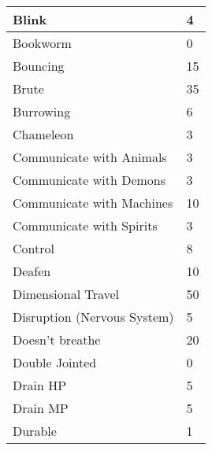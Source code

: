 \documentclass[twoside]{book}
\begin{document}
\begin{longtable}{p{1.25in}l}
  \raggedright
           Blink 
  &
   4 
  \tabularnewline
  \hline
      
  \raggedright
           Bookworm 
  &
   0 
  \tabularnewline
  \hline
      
  \raggedright
           Bouncing 
  &
   15 
  \tabularnewline
  \hline
      
  \raggedright
           Brute 
  &
   35 
  \tabularnewline
  \hline
      
  \raggedright
           Burrowing 
  &
   6 
  \tabularnewline
  \hline
      
  \raggedright
           Chameleon 
  &
   3 
  \tabularnewline
  \hline
      
  \raggedright
           Communicate with Animals
           
  &
   3 
  \tabularnewline
  \hline
      
  \raggedright
           Communicate with Demons
           
  &
   3 
  \tabularnewline
  \hline
      
  \raggedright
           Communicate with Machines
           
  &
   10 
  \tabularnewline
  \hline
      
  \raggedright
           Communicate with Spirits
           
  &
   3 
  \tabularnewline
  \hline
      
  \raggedright
           Control 
  &
   8 
  \tabularnewline
  \hline
      
  \raggedright
           Deafen 
  &
   10 
  \tabularnewline
  \hline
      
  \raggedright
           Dimensional Travel 
  &
   50 
  \tabularnewline
  \hline
      
  \raggedright
           Disruption (Nervous System)
           
  &
   5 
  \tabularnewline
  \hline
      
  \raggedright
           Doesn't breathe 
  &
   20 
  \tabularnewline
  \hline
      
  \raggedright
           Double Jointed 
  &
   0 
  \tabularnewline
  \hline
      
  \raggedright
           Drain HP 
  &
   5 
  \tabularnewline
  \hline
      
  \raggedright
           Drain MP 
  &
   5 
  \tabularnewline
  \hline
      
  \raggedright
           Durable 
  &
   1 
  \tabularnewline
  \hline
      

\end{longtable}
\end{document}
